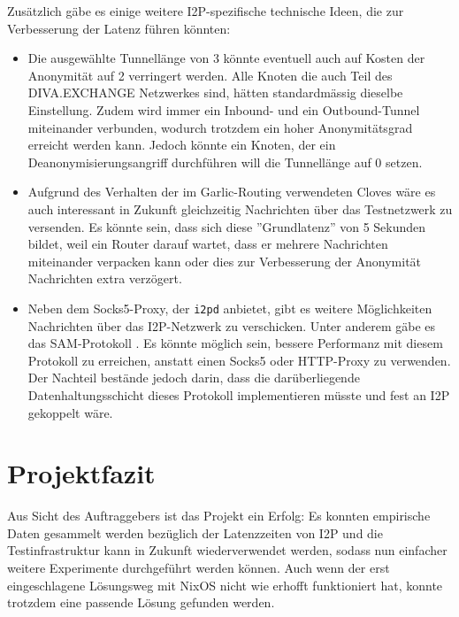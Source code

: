 Zusätzlich gäbe es einige weitere I2P-spezifische technische Ideen, die zur Verbesserung der Latenz führen könnten:
\begin{itemize}
  \item Die ausgewählte Tunnellänge von 3 könnte eventuell auch auf Kosten der Anonymität auf 2 verringert werden. Alle Knoten die auch Teil des DIVA.EXCHANGE Netzwerkes sind, hätten standardmässig dieselbe Einstellung.
    Zudem wird immer ein Inbound- und ein Outbound-Tunnel miteinander verbunden, wodurch trotzdem ein hoher Anonymitätsgrad erreicht werden kann.
    Jedoch könnte ein Knoten, der ein Deanonymisierungsangriff durchführen will die Tunnellänge auf 0 setzen.
  \item Aufgrund des Verhalten der im Garlic-Routing verwendeten Cloves wäre es auch interessant in Zukunft gleichzeitig Nachrichten über das Testnetzwerk zu versenden. Es könnte sein, dass sich diese ''Grundlatenz'' von 5 Sekunden bildet, weil ein Router darauf wartet, dass er mehrere Nachrichten miteinander verpacken kann oder dies zur Verbesserung der Anonymität Nachrichten extra verzögert.
  \item Neben dem Socks5-Proxy, der \lstinline|i2pd| anbietet, gibt es weitere Möglichkeiten Nachrichten über das I2P-Netzwerk zu verschicken.
    Unter anderem gäbe es das SAM-Protokoll \parencite{noauthor_sam_nodate}.
    Es könnte möglich sein, bessere Performanz mit diesem Protokoll zu erreichen, anstatt einen Socks5 oder HTTP-Proxy zu verwenden. 
    Der Nachteil bestände jedoch darin, dass die darüberliegende Datenhaltungsschicht dieses Protokoll implementieren müsste und fest an I2P gekoppelt wäre.
\end{itemize}


\section{Projektfazit}

Aus Sicht des Auftraggebers ist das Projekt ein Erfolg:
Es konnten empirische Daten gesammelt werden bezüglich der Latenzzeiten von I2P und die Testinfrastruktur kann in Zukunft wiederverwendet werden, sodass nun einfacher weitere Experimente durchgeführt werden können.
Auch wenn der erst eingeschlagene Lösungsweg mit NixOS nicht wie erhofft funktioniert hat, konnte trotzdem eine passende Lösung gefunden werden.


